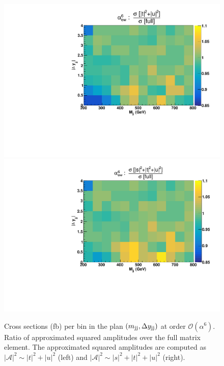 \begin{figure}[hbt]
\centering
\includegraphics[scale=0.395]{figures/scanfigures/ratio_tu.pdf}
\includegraphics[scale=0.395]{figures/scanfigures/ratio_stu.pdf}
\caption{Cross sections (fb) per bin in the plan $\left(m_{\text{j}\text{j}}, \Delta y_{\text{j}\text{j}}\right)$ at order $\mathcal{O}(\alpha^6)$. 
Ratio of approximated squared amplitudes over the full matrix element. The approximated squared amplitudes are computed as $|\mathcal{A}|^2 \sim |t|^2 + |u|^2$ (left) and $|\mathcal{A}|^2 \sim |s|^2 + |t|^2 + |u|^2$ (right).}
\label{fig:ratio2d_LO}
\end{figure}

